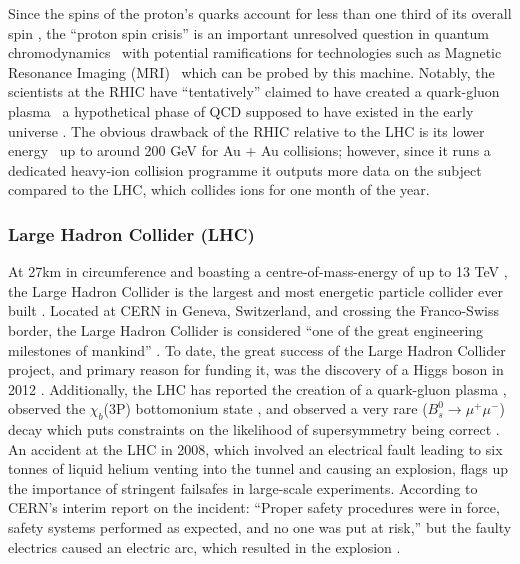 Since the spins of the proton's quarks account for less than one third of its overall spin \cite{PhysLettB:ProtonSpin}, the ``proton spin crisis'' is an important unresolved question in quantum chromodynamics \textemdash \, with potential ramifications for technologies such as Magnetic Resonance Imaging (MRI) \textemdash \, which can be probed by this machine. Notably, the scientists at the RHIC have ``tentatively'' claimed to have created a quark-gluon plasma \cite{NucPhysA:QuarkGluon} \textemdash \, a hypothetical phase of QCD supposed to have existed in the early universe \cite{CERN:QuarkGluonPlasma:Online}. The obvious drawback of the RHIC relative to the LHC is its lower energy \textemdash \, up to around 200 GeV for Au + Au collisions; however, since it runs a dedicated heavy-ion collision programme it outputs more data on the subject compared to the LHC, which collides ions for one month of the year.

\subsubsection{Large Hadron Collider (LHC)}
At 27km in circumference and boasting a centre-of-mass-energy of up to 13 TeV \cite{LHC:14TeV:Online,CERN:14TeV:Online}, the Large Hadron Collider is the largest and most energetic particle collider ever built \cite{LHC:Home}. Located at CERN in Geneva, Switzerland, and crossing the Franco-Swiss border, the Large Hadron Collider is considered ``one of the great engineering milestones of mankind'' \cite{LHC:Milestone:Online}. To date, the great success of the Large Hadron Collider project, and primary reason for funding it, was the discovery of a Higgs boson in 2012 \cite{PhysLettB:Higgs:ATLAS,PhysLettB:Higgs:CMS}. Additionally, the LHC has reported the creation of a quark-gluon plasma \cite{NatGeo:QuarkGluon:Online}, observed the $\chi_{b}$(3P) bottomonium state \cite{arXiv:ATLAS:Bottomonium}, and observed a very rare ($B_{s}^{0} \rightarrow \mu^{+}\mu^{-}$) decay which puts constraints on the likelihood of supersymmetry being correct \cite{BBC:SUSY}. An accident at the LHC in 2008, which involved an electrical fault leading to six tonnes of liquid helium venting into the tunnel and causing an explosion, flags up the importance of stringent failsafes in large-scale experiments. \cite{BBC:MagnetQuench:Online} According to CERN's interim report on the incident: ``Proper safety procedures were in force, safety 
systems performed as expected, and no one was put at risk,'' but the faulty electrics caused an electric arc, which resulted in the explosion \cite{CERN:IncidentReport}.

